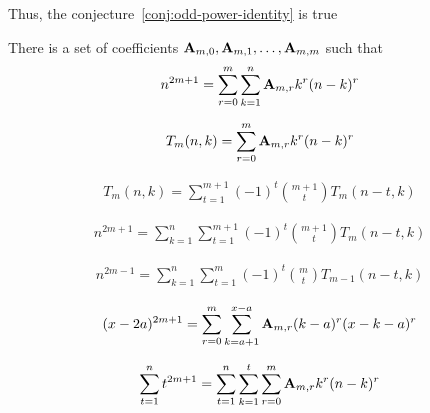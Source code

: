 Thus, the conjecture~\eqref{conj:odd-power-identity} is true

\begin{theorem}
    \label{theorem:odd-power-identity}
    There is a set of coefficients ${\mathbf{A}} \sb{m,0}, {\mathbf{A}} \sb{m,1}, \ldots, {\mathbf{A}} \sb{m,m}$ such that
    \begin{align*}
        n^{2m+1} = \sum_{r=0}^{m} \sum_{k=1}^{n} {\mathbf{A}} \sb{m,r} k^r (n-k)^r
    \end{align*}
\end{theorem}

\begin{definition}
    \begin{align*}
        T_{m}(n,k) = \sum_{r=0}^{m} {\mathbf{A}} \sb{m,r} k^r (n-k)^r
    \end{align*}
\end{definition}

\begin{proposition}
    \begin{align*}
        T_{m} (n, k) = \sum_{t=1}^{m+1} (-1)^t \binom{m+1}{t} T_{m} (n-t, k)
    \end{align*}
\end{proposition}

\begin{proposition}
    \begin{align*}
        n^{2m+1} = \sum_{k=1}^{n} \sum_{t=1}^{m+1} (-1)^t \binom{m+1}{t} T_{m} (n-t, k)
    \end{align*}
\end{proposition}

\begin{corollary}
    \begin{align*}
        n^{2m-1} = \sum_{k=1}^{n} \sum_{t=1}^{m} (-1)^t \binom{m}{t} T_{m-1} (n-t, k)
    \end{align*}
\end{corollary}

\begin{proposition}
    \begin{align*}
    (x-2a)
        ^{2m+1} = \sum_{r=0}^{m} \sum_{k=a+1}^{x-a} {\mathbf{A}} \sb{m,r} (k-a)^r (x-k-a)^r
    \end{align*}
\end{proposition}

\begin{proposition}
    \begin{align*}
        \sum_{t=1}^{n} t^{2m+1} = \sum_{t=1}^{n} \sum_{k=1}^{t} \sum_{r=0}^{m} {\mathbf{A}} \sb{m,r} k^r (n-k)^r
    \end{align*}
\end{proposition}
